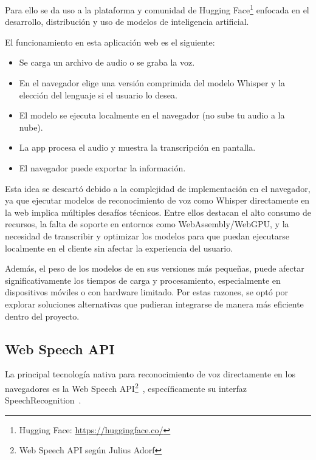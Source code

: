 \documentclass[a4paper, 12pt]{book}
\begin{document}
Para ello se da uso a la plataforma y comunidad de Hugging Face\footnote{Hugging Face: \scriptsize\url{https://huggingface.co/}} enfocada en el desarrollo, distribución y uso de modelos de inteligencia artificial. 

El funcionamiento en esta aplicación web es el siguiente: 
\begin{itemize}
  \setlength\itemsep{0.3em}  %
  \item Se carga un archivo de audio o se graba la voz.
  \item En el navegador elige una versión comprimida del modelo Whisper y la elección del lenguaje si el usuario lo desea.
  \item El modelo se ejecuta localmente en el navegador (no sube tu audio a la nube).
  \item La app procesa el audio y muestra la transcripción en pantalla.
  \item El navegador puede exportar la información.
\end{itemize}
Esta idea se descartó debido a la complejidad de implementación en el navegador, ya que ejecutar modelos de reconocimiento de voz como Whisper directamente en la web implica múltiples desafíos técnicos. Entre ellos destacan el alto consumo de recursos, la falta de soporte en entornos como WebAssembly/WebGPU, y la necesidad de transcribir y optimizar los modelos para que puedan ejecutarse localmente en el cliente sin afectar la experiencia del usuario.

Además, el peso de los modelos de en sus versiones más pequeñas, puede afectar significativamente los tiempos de carga y procesamiento, especialmente en dispositivos móviles o con hardware limitado. Por estas razones, se optó por explorar soluciones alternativas que pudieran integrarse de manera más eficiente dentro del proyecto.

\subsection{Web Speech API}

La principal tecnología nativa para reconocimiento de voz directamente en los navegadores es la Web Speech API\footnote{Web Speech API según Julius Adorf}~\cite{adorf2013web}, específicamente su interfaz SpeechRecognition~\cite{web_speech_api}.
\end{document}
